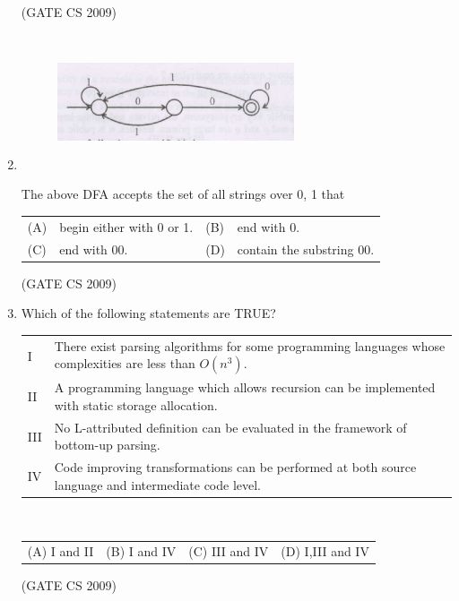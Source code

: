 \documentclass[a4paper, 11pt]{article}
\begin{document}
\begin{enumerate}
    \hfill (GATE CS 2009)
    
    \item
    \begin{figure}[H]
        \centering
        \includegraphics[width=7cm, height= 4cm]{figs/q41.png}
        \caption{}
        \label{fig:placeholder}
    \end{figure}
        
    The above DFA accepts the set of all strings over {0, 1} that\\
    \begin{tabularx}{\textwidth}{@{}lX lX@{}}
    (A) & begin either with 0 or 1.  &  (B) &end with 0. \\
    (C) & end with 00. & (D)  &contain the substring 00.
    \end{tabularx}   

    \hfill (GATE CS 2009)
    
    \item Which of the following statements are TRUE?\\
    \begin{tabular}{ll}
        I & There exist parsing algorithms for some programming languages whose complexities are less than $O(n^3)$. \\
        II & A programming language which allows recursion can be implemented with static storage allocation.\\
        III & No L-attributed definition can be evaluated in the framework of bottom-up parsing. \\
        IV & Code improving transformations can be performed at both source language and intermediate code level.
    \end{tabular}\\
    \begin{tabularx}{\textwidth}{@{}XXXX@{}}
       (A) I and II  & (B) I and IV & (C) III and IV & (D) I,III and IV  \\
    \end{tabularx}

    \hfill (GATE CS 2009)


\end{enumerate}
\end{document}
